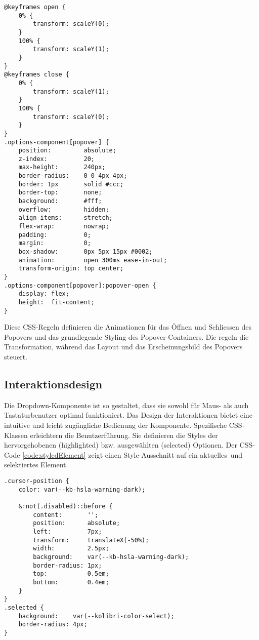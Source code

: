 \begin{lstlisting}[style = htmlcssjs, caption = CSS für das Popover-Element, label = code:popoverStyle]
@keyframes open {
    0% {
        transform: scaleY(0);
    }
    100% {
        transform: scaleY(1);
    }
}
@keyframes close {
    0% {
        transform: scaleY(1);
    }
    100% {
        transform: scaleY(0);
    }
}
.options-component[popover] {
    position:         absolute;
    z-index:          20;
    max-height:       240px;
    border-radius:    0 0 4px 4px;
    border: 1px       solid #ccc;
    border-top:       none;
    background:       #fff;
    overflow:         hidden;
    align-items:      stretch;
    flex-wrap:        nowrap;
    padding:          0;
    margin:           0;
    box-shadow:       0px 5px 15px #0002;
    animation:        open 300ms ease-in-out;
    transform-origin: top center;
}
.options-component[popover]:popover-open {
    display: flex;
    height:  fit-content;
} 
\end{lstlisting}

Diese CSS-Regeln definieren die Animationen für das Öffnen und Schliessen des Popovers und das grundlegende Styling des Popover-Containers.
Die  regeln die Transformation, während  das Layout und das Erscheinungsbild des Popovers steuert.


\subsection{Interaktionsdesign}
\label{sec:interactionDesign}

Die Dropdown-Komponente ist so gestaltet, dass sie sowohl für Maus- als auch Tastaturbenutzer optimal funktioniert. 
Das Design der Interaktionen bietet eine intuitive und leicht zugängliche Bedienung der Komponente.
Spezifische CSS-Klassen erleichtern die Benutzerführung.
Sie definieren die Styles der hervorgehobenen (highlighted) bzw. ausgewählten (selected) Optionen.
Der CSS-Code \ref{code:styledElement} zeigt einen Style-Ausschnitt auf ein aktuelles\footnotemark \ und selektiertes Element.

\begin{lstlisting}[style = htmlcssjs, caption = Aktuelle (\codestyle{cursor-position}) und ausgewählte (\codestyle{selected}) Option, label = code:styledElement]
.cursor-position {
    color: var(--kb-hsla-warning-dark);

    &:not(.disabled)::before {
        content:       '';
        position:      absolute;
        left:          7px;
        transform:     translateX(-50%);
        width:         2.5px;
        background:    var(--kb-hsla-warning-dark);
        border-radius: 1px;
        top:           0.5em;
        bottom:        0.4em;
    }
}
.selected {
    background:    var(--kolibri-color-select);
    border-radius: 4px;
}
\end{lstlisting}

